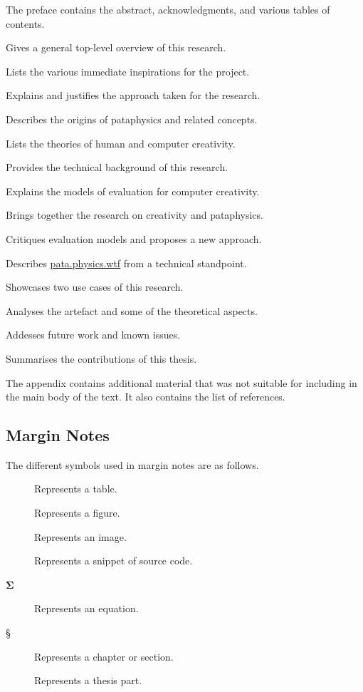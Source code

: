 The preface contains the abstract, acknowledgments, and various tables of contents.

\begin{description}[leftmargin=3.5cm]
  \item[Introduction] Gives a general top-level overview of this research.
  \item[Inspirations] Lists the various immediate inspirations for the project.
  \item[Methodology] Explains and justifies the approach taken for the research.
  \item[Pataphysics] Describes the origins of pataphysics and related concepts. 
  \item[Creativity] Lists the theories of human and computer creativity.
  \item[Technology] Provides the technical background of this research.
  \item[Evaluation] Explains the models of evaluation for computer creativity.
  \item[Foundations] Brings together the research on creativity and pataphysics.
  \item[Interpretation] Critiques evaluation models and proposes a new approach.
  \item[Implementation] Describes \url{pata.physics.wtf} from a technical standpoint.
  \item[Applications] Showcases two use cases of this research.
  \item[Patanalysis] Analyses the artefact and some of the theoretical aspects. 
  \item[Asprirations] Addesses future work and known issues.
  \item[Outroduction] Summarises the contributions of this thesis.
\end{description}

The appendix contains additional material that was not suitable for including in the main body of the text. It also contains the list of references.


\subsection{Margin Notes}

The different symbols used in margin notes are as follows.

\begin{description}
  \item [] Represents a table.
  \item [] Represents a figure.
  \item [] Represents an image.
  \item [] Represents a snippet of source code.
  \item [$\bm{\Sigma}$] Represents an equation.
  \item [§] Represents a chapter or section.
  \item [\textspiral] Represents a thesis part.
\end{description}


